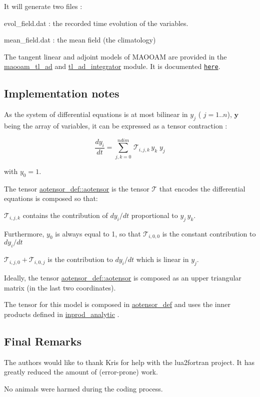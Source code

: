 It will generate two files \-:
\begin{DoxyItemize}
\item evol\-\_\-field.\-dat \-: the recorded time evolution of the variables.
\item mean\-\_\-field.\-dat \-: the mean field (the climatology)
\end{DoxyItemize}

The tangent linear and adjoint models of M\-A\-O\-O\-A\-M are provided in the \hyperlink{classmaooam__tl__ad}{maooam\-\_\-tl\-\_\-ad} and \hyperlink{classtl__ad__integrator}{tl\-\_\-ad\-\_\-integrator} module. It is documented \href{./md_README_TL_AD.html}{\tt here}. 



\subsection*{Implementation notes}

As the system of differential equations is at most bilinear in $y_j$ ( $j=1..n$), $\boldsymbol{y}$ being the array of variables, it can be expressed as a tensor contraction \-:

\[ \frac{d y_i}{dt} = \sum_{j,k=0}^{ndim} \, \mathcal{T}_{i,j,k} \, y_k \; y_j \]

with $y_0 = 1$.

The tensor \hyperlink{classaotensor__def_a0dc43bc9294a18f2fe57b67489f1702f}{aotensor\-\_\-def\-::aotensor} is the tensor $\mathcal{T}$ that encodes the differential equations is composed so that\-:


\begin{DoxyItemize}
\item $\mathcal{T}_{i,j,k}$ contains the contribution of $dy_i/dt$ proportional to $ y_j \, y_k$.
\item Furthermore, $y_0$ is always equal to 1, so that $\mathcal{T}_{i,0,0}$ is the constant contribution to $dy_i/dt$
\item $\mathcal{T}_{i,j,0} + \mathcal{T}_{i,0,j}$ is the contribution to $dy_i/dt$ which is linear in $y_j$.
\end{DoxyItemize}

Ideally, the tensor \hyperlink{classaotensor__def_a0dc43bc9294a18f2fe57b67489f1702f}{aotensor\-\_\-def\-::aotensor} is composed as an upper triangular matrix (in the last two coordinates).

The tensor for this model is composed in \hyperlink{classaotensor__def}{aotensor\-\_\-def} and uses the inner products defined in \hyperlink{classinprod__analytic}{inprod\-\_\-analytic} . 



\subsection*{Final Remarks}

The authors would like to thank Kris for help with the lua2fortran project. It has greatly reduced the amount of (error-\/prone) work.

No animals were harmed during the coding process. 